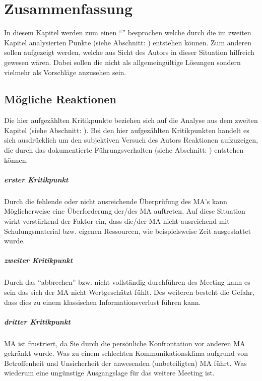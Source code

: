 \chapter{Zusammenfassung}
\label{chap:zusammenfassung}

In diesem Kapitel werden zum einen "`"' besprochen welche durch die im zweiten Kapitel analysierten Punkte (siehe Abschnitt: ) entstehen können. 
Zum anderen sollen  aufgezeigt werden, welche aus Sicht des Autors in dieser Situation hilfreich gewesen wären. 
Dabei sollen die  nicht als allgemeingültige Lösungen sondern vielmehr als Vorschläge anzusehen sein. 

\section{Mögliche Reaktionen}
\label{sec:moegl_reaktionen}

Die hier aufgezählten Kritikpunkte beziehen sich auf die Analyse aus dem zweiten Kapitel (siehe Abschnitt: ).
Bei den hier aufgezählten Kritikpunkten handelt es sich ausdrücklich um den subjektiven Versuch des Autors Reaktionen aufzuzeigen, die durch das dokumentierte Führungsverhalten (siehe Abschnitt: ) entstehen können.

\paragraph*{erster Kritikpunkt}
\label{par:1kritik}
Durch die fehlende oder nicht ausreichende Überprüfung des \ac{MA}'s kann Möglicherweise eine Überforderung der/des \ac{MA} auftreten. 
Auf diese Situation wirkt verstärkend der Faktor ein, dass die/der \ac{MA} nicht ausreichend mit Schulungsmaterial bzw. eigenen Ressourcen, wie beispielsweise Zeit ausgestattet wurde.  

\pagebreak

\paragraph*{zweiter Kritikpunkt}
\label{par:2kritik}
Durch das "`abbrechen"' bzw. nicht vollständig durchführen des Meeting kann es sein das sich der \ac{MA} nicht Wertgeschätzt fühlt. 
Des weiteren besteht die Gefahr, dass dies zu einem klassischen Informationsverlust führen kann. 


\paragraph*{dritter Kritikpunkt} 
\label{par:3kritik}
\ac{MA} ist frustriert, da Sie durch die persönliche Konfrontation vor anderen \ac{MA} gekränkt wurde. 
Was zu einem schlechten Kommunikationsklima aufgrund von Betroffenheit und Unsicherheit der anwesenden (unbeteiligten) \ac{MA} führt. 
Was wiederum eine ungünstige Ausgangslage für das weitere Meeting ist.\\

